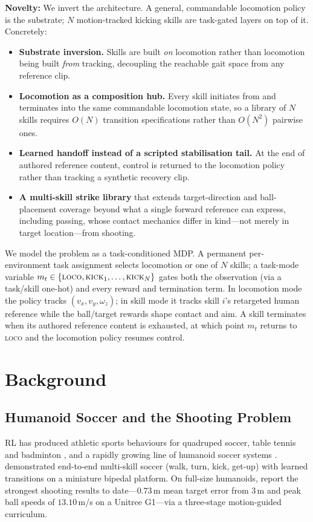 \documentclass{article}
\begin{document}
\textbf{Novelty:} We invert the architecture. A general, commandable locomotion policy is the substrate; $N$ motion-tracked kicking skills are task-gated layers on top of it. Concretely:
\begin{itemize}
  \item \textbf{Substrate inversion.} Skills are built \emph{on} locomotion rather than locomotion being built \emph{from} tracking, decoupling the reachable gait space from any reference clip.
  \item \textbf{Locomotion as a composition hub.} Every skill initiates from and terminates into the same commandable locomotion state, so a library of $N$ skills requires $O(N)$ transition specifications rather than $O(N^2)$ pairwise ones.
  \item \textbf{Learned handoff instead of a scripted stabilisation tail.} At the end of authored reference content, control is returned to the locomotion policy rather than tracking a synthetic recovery clip.
  \item \textbf{A multi-skill strike library} that extends target-direction and ball-placement coverage beyond what a single forward reference can express, including passing, whose contact mechanics differ in kind---not merely in target location---from shooting.
\end{itemize}

We model the problem as a task-conditioned MDP. A permanent per-environment task assignment selects locomotion or one of $N$ skills; a task-mode variable $m_t \in \{\textsc{loco}, \textsc{kick}_1, \dots, \textsc{kick}_N\}$ gates both the observation (via a task/skill one-hot) and every reward and termination term. In locomotion mode the policy tracks $(v_x, v_y, \omega_z)$; in skill mode it tracks skill $i$'s retargeted human reference while the ball/target rewards shape contact and aim. A skill terminates when its authored reference content is exhausted, at which point $m_t$ returns to \textsc{loco} and the locomotion policy resumes control.

\section{Background}

\subsection{Humanoid Soccer and the Shooting Problem}
RL has produced athletic sports behaviours for quadruped soccer, table tennis and badminton \citep{quadsoccer,hitter,badminton}, and a rapidly growing line of humanoid soccer systems \citep{haarnoja2024soccer,reactive,striker,humanx,paid,stoft,goalkeeper}. \citet{haarnoja2024soccer} demonstrated end-to-end multi-skill soccer (walk, turn, kick, get-up) with learned transitions on a miniature bipedal platform. On full-size humanoids, \citet{robonaldo} report the strongest shooting results to date---$0.73$\,m mean target error from $3$\,m and peak ball speeds of $13.10$\,m/s on a Unitree G1---via a three-stage motion-guided curriculum.
\end{document}
